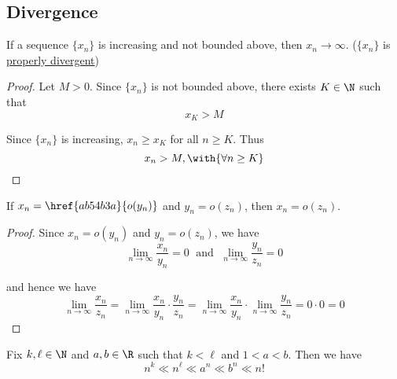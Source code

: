 \subsection{Divergence}\label{fb410c1}

\label{dfd30ec}

If a sequence $\{x_n\}$ is increasing and not bounded above, then
$x_n\to\infty$. ($\{x_n\}$ is \href{eb71424}{properly divergent})

\begin{proof}
  Let $M>0$. Since $\{x_n\}$ is not bounded above, there exists $K\in\N$ such
  that
  $$
    x_K>M
  $$

  Since $\{x_n\}$ is increasing, $x_n\geq x_K$ for all $n\geq K$. Thus
  $$
    x_n>M,\with{\forall n\geq K}
  $$
\end{proof}

\label{d0cc0f9}

If $x_n=\href{ab54b3a}{o(y_n)}$ and $y_n=o(z_n)$, then $x_n=o(z_n)$.

\begin{proof}
  Since $x_n=o(y_n)$ and $y_n=o(z_n)$, we have
  $$
    \lim_{n\to\infty}\frac{x_n}{y_n}=0\;\text{ and }\;
    \lim_{n\to\infty}\frac{y_n}{z_n}=0
  $$

  and hence we have
  \begin{equation*}
    \lim_{n\to\infty}\frac{x_n}{z_n}
    =\lim_{n\to\infty}\frac{x_n}{y_n}\cdot\frac{y_n}{z_n}
    =\lim_{n\to\infty}\frac{x_n}{y_n}\cdot\lim_{n\to\infty}\frac{y_n}{z_n}
    =0\cdot0=0
  \end{equation*}
\end{proof}

\label{a7e3707}

Fix $k,\ell\in\N$ and $a,b\in\R$ such that $k<\ell$ and $1<a<b$. Then we have
$$
  n^k\ll n^\ell\ll a^n\ll b^n\ll n!
$$

